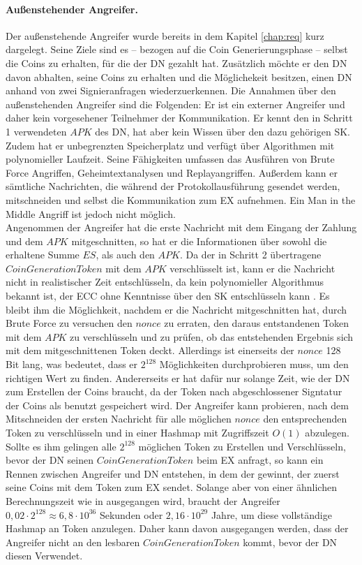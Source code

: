 \documentclass[
	fontsize=11pt,
	headings=small,
	parskip=half,           %
	bibliography=totoc,
	numbers=noenddot,       %
	open=any,               %
]{scrreprt}
\begin{document}
\paragraph{Außenstehender Angreifer.} Der außenstehende Angreifer wurde bereits in dem Kapitel \ref{chap:req} kurz dargelegt. Seine Ziele sind es -- bezogen auf die Coin Generierungsphase -- selbst die Coins zu erhalten, für die der DN gezahlt hat. Zusätzlich möchte er den DN davon abhalten, seine Coins zu erhalten und die Möglichekeit besitzen, einen DN anhand von zwei Signieranfragen wiederzuerkennen. Die Annahmen über den außenstehenden Angreifer sind die Folgenden: Er ist ein externer Angreifer und daher kein vorgesehener Teilnehmer der Kommunikation. Er kennt den in Schritt 1 verwendeten $APK$ des DN, hat aber kein Wissen über den dazu gehörigen SK. Zudem hat er unbegrenzten Speicherplatz und verfügt über Algorithmen mit polynomieller Laufzeit. Seine Fähigkeiten umfassen das Ausführen von Brute Force Angriffen, Geheimtextanalysen und Replayangriffen. Außerdem kann er sämtliche Nachrichten, die während der Protokollausführung gesendet werden, mitschneiden und selbst die Kommunikation zum EX aufnehmen. Ein Man in the Middle Angriff ist jedoch nicht möglich.\\

Angenommen der Angreifer hat die erste Nachricht mit dem Eingang der Zahlung und dem $APK$ mitgeschnitten, so hat er die Informationen über sowohl die erhaltene Summe $ES$, als auch den $APK$. Da der in Schritt 2 übertragene $CoinGenerationToken$ mit dem $APK$ verschlüsselt ist, kann er die Nachricht nicht in realistischer Zeit entschlüsseln, da kein polynomieller Algorithmus bekannt ist, der ECC ohne Kenntnisse über den SK entschlüsseln kann \cite{ecc-bos2009security}. Es bleibt ihm die Möglichkeit, nachdem er die Nachricht mitgeschnitten hat, durch Brute Force zu versuchen den $nonce$ zu erraten, den daraus entstandenen Token mit dem $APK$ zu verschlüsseln und zu prüfen, ob das entstehenden Ergebnis sich mit dem mitgeschnittenen Token deckt. Allerdings ist einerseits der $nonce$ 128 Bit lang, was bedeutet, dass er $2^{128}$ Möglichkeiten durchprobieren muss, um den richtigen Wert zu finden. Andererseits er hat dafür nur solange Zeit, wie der DN zum Erstellen der Coins braucht, da der Token nach abgeschlossener Signtatur der Coins als benutzt gespeichert wird. Der Angreifer kann probieren, nach dem Mitschneiden der ersten Nachricht für alle möglichen $nonce$ den entsprechenden Token zu verschlüsseln und in einer Hashmap mit Zugriffszeit $O(1)$ abzulegen. Sollte es ihm gelingen alle $2^{128}$ möglichen Token zu Erstellen und Verschlüsseln, bevor der DN seinen $CoinGenerationToken$ beim EX anfragt, so kann ein Rennen zwischen Angreifer und DN entstehen, in dem der gewinnt, der zuerst seine Coins mit dem Token zum EX sendet. Solange aber von einer ähnlichen Berechnungszeit wie in \cite{nofriansyah2018efficiency} ausgegangen wird, braucht der Angreifer $0,02 \cdot 2^{128}\approx 6,8\cdot10^{36}$ Sekunden oder $2,16\cdot10^{29}$ Jahre, um diese vollständige Hashmap an Token anzulegen. Daher kann davon ausgegangen werden, dass der Angreifer nicht an den lesbaren $CoinGenerationToken$ kommt, bevor der DN diesen Verwendet.\\
\end{document}
